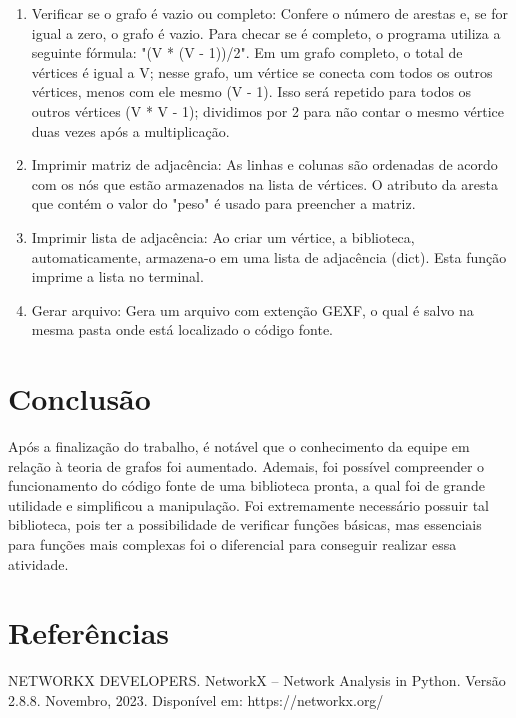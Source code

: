 \documentclass[12pt]{article}
\begin{document}
\begin{enumerate}[itemsep=8pt,parsep=8pt]
    \item Verificar se o grafo é vazio ou completo: Confere o número de arestas e, se for igual a zero, o grafo é vazio. Para checar se é completo, o programa utiliza a seguinte fórmula: "(V * (V - 1))/2". Em um grafo completo, o total de vértices é igual a V; nesse grafo, um vértice se conecta com todos os outros vértices, menos com ele mesmo (V - 1). Isso será repetido para todos os outros vértices (V * V - 1); dividimos por 2 para não contar o mesmo vértice duas vezes após a multiplicação.
    
    \item Imprimir matriz de adjacência: As linhas e colunas são ordenadas de acordo com os nós que estão armazenados na lista de vértices. O atributo da aresta que contém o valor do "peso" é usado para preencher a matriz.
    
    \item Imprimir lista de adjacência: Ao criar um vértice, a biblioteca, automaticamente, armazena-o em uma lista de adjacência (dict). Esta função imprime a lista no terminal.
    
    \item Gerar arquivo: Gera um arquivo com extenção GEXF, o qual é salvo na mesma pasta onde está localizado o código fonte.
    
\end{enumerate}

\section{Conclusão}

Após a finalização do trabalho, é notável que o conhecimento da equipe em relação à teoria de grafos foi aumentado. Ademais, foi possível compreender o funcionamento do código fonte de uma biblioteca pronta, a qual foi de grande utilidade e simplificou a manipulação. Foi extremamente necessário possuir tal biblioteca, pois ter a possibilidade de verificar funções básicas, mas essenciais para funções mais complexas foi o diferencial para conseguir realizar essa atividade.

\section{Referências}

NETWORKX DEVELOPERS. NetworkX -- Network Analysis in Python. Versão 2.8.8. Novembro, 2023. Disponível em: https://networkx.org/
\end{document}
